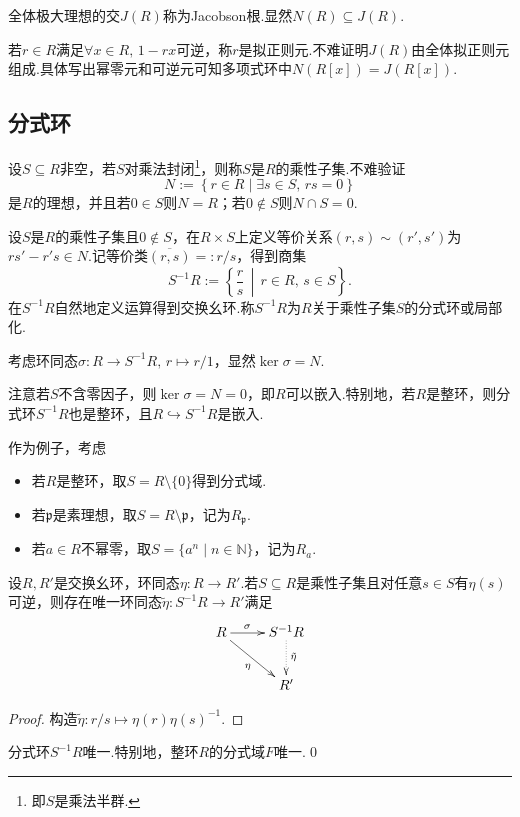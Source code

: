 全体极大理想的交$J(R)$称为{\heiti Jacobson根}.显然$N(R)\subseteq J(R)$.

若$r\in R$满足$\forall x\in R,\,1-rx$可逆，称$r$是{\heiti 拟正则元}.不难证明$J(R)$由全体拟正则元组成.具体写出幂零元和可逆元可知多项式环中$N(R[x])=J(R[x])$.

\subsection{分式环}
设$S\subseteq R$非空，若$S$对乘法封闭\footnote{即$S$是乘法半群.}，则称$S$是$R$的{\heiti 乘性子集}.不难验证
\[
    N:=\left\{r\in R\mid \exists s\in S,\,rs=0\right\}
\]
是$R$的理想，并且若$0\in S$则$N=R$；若$0\notin S$则$N\cap S=0$.

设$S$是$R$的乘性子集且$0\notin S$，在$R\times S$上定义等价关系$(r,s)\sim(r',s')$为$rs'-r's\in N$.记等价类$\overline{(r,s)}=:r/s$，得到商集
\[
    S^{-1}R:=\left\{\frac{r}{s}\,\middle|\, r\in R,\,s\in S\right\}.
\]
在$S^{-1}R$自然地定义运算得到交换幺环.称$S^{-1}R$为$R$关于乘性子集$S$的{\heiti 分式环}或{\heiti 局部化}.

考虑环同态$\sigma\colon R\to S^{-1}R,\,r\mapsto r/1$，显然$\ker\sigma=N$.

注意若$S$不含零因子，则$\ker\sigma=N=0$，即$R$可以嵌入.特别地，若$R$是整环，则分式环$S^{-1}R$也是整环，且$R\hookrightarrow S^{-1}R$是嵌入.

作为例子，考虑
\begin{itemize}
    \item 若$R$是整环，取$S=R\setminus\{0\}$得到{\heiti 分式域}.
    \item 若$\mathfrak{p}$是素理想，取$S=R\setminus\mathfrak{p}$，记为$R_{\mathfrak{p}}$.
    \item 若$a\in R$不幂零，取$S=\{a^n\mid n\in\mathbb{N}\}$，记为$R_a$.
\end{itemize}

\begin{prop}
    设$R,R'$是交换幺环，环同态$\eta\colon R\to R'$.若$S\subseteq R$是乘性子集且对任意$s\in S$有$\eta(s)$可逆，则存在唯一环同态$\tilde{\eta}\colon S^{-1}R\to R'$满足
    \[
        \xymatrix{
        R\ar[r]^(0.4)\sigma\ar[rd]_\eta&S^{-1}R\ar@{.>}[d]^(0.45){\tilde{\eta}}\\
        &R'
        }
    \]
\end{prop}
\begin{proof}
    构造$\tilde{\eta}\colon r/s\mapsto \eta(r)\eta(s)^{-1}$.
\end{proof}
\begin{cor*}
    分式环$S^{-1}R$唯一.特别地，整环$R$的分式域$F$唯一.\qed
\end{cor*}

